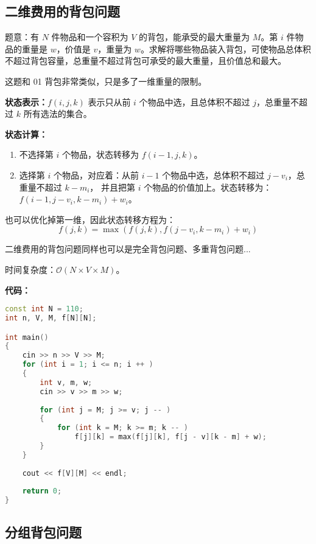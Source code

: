 \subsection{二维费用的背包问题}

题意：有 $N$ 件物品和一个容积为 $V$ 的背包，能承受的最大重量为 $M$。第 $i$ 件物品的重量是 $w$，价值是 $v$，重量为 $w$。求解将哪些物品装入背包，可使物品总体积不超过背包容量，总重量不超过背包可承受的最大重量，且价值总和最大。

这题和 01 背包非常类似，只是多了一维重量的限制。

\textbf{状态表示：$f(i, j, k)$} 表示只从前 $i$ 个物品中选，且总体积不超过 $j$，总重量不超过 $k$ 所有选法的集合。

\textbf{状态计算：}

\begin{enumerate}
\item 不选择第 $i$ 个物品，状态转移为 $f(i - 1, j, k)$。
\item 选择第 $i$ 个物品，对应着：从前 $i - 1$ 个物品中选，总体积不超过 $j - v_i$，总重量不超过 $k - m_i$， 并且把第 $i$ 个物品的价值加上。状态转移为：$f(i - 1, j - v_i, k - m_i) + w_i$。
\end{enumerate}

也可以优化掉第一维，因此状态转移方程为：
\begin{equation}
f(j, k) = \max(f(j, k), f(j - v_i, k - m_i) + w_i)
\end{equation}

二维费用的背包问题同样也可以是完全背包问题、多重背包问题...

时间复杂度：$\mathcal{O}(N \times V \times M)$。

\textbf{代码：}

\begin{lstlisting}[language=cpp]
const int N = 110;
int n, V, M, f[N][N];

int main()
{
    cin >> n >> V >> M;
    for (int i = 1; i <= n; i ++ )
    {
        int v, m, w;
        cin >> v >> m >> w;
        
        for (int j = M; j >= v; j -- )
        {
            for (int k = M; k >= m; k -- )
                f[j][k] = max(f[j][k], f[j - v][k - m] + w);
        }
    }
    
    cout << f[V][M] << endl;
    
    return 0;
}
\end{lstlisting}

\subsection{分组背包问题}

